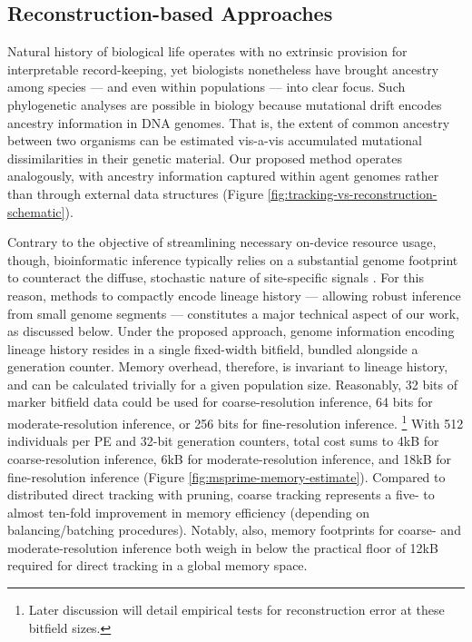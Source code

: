 

\subsection{Reconstruction-based Approaches}

Natural history of biological life operates with no extrinsic provision for interpretable record-keeping, yet biologists nonetheless have brought ancestry among species --- and even within populations --- into clear focus.
Such phylogenetic analyses are possible in biology because mutational drift encodes ancestry information in DNA genomes.
That is, the extent of common ancestry between two organisms can be estimated vis-a-vis accumulated mutational dissimilarities in their genetic material.
Our proposed method operates analogously, with ancestry information captured within agent genomes rather than through external data structures (Figure \ref{fig:tracking-vs-reconstruction-schematic}).

Contrary to the objective of streamlining necessary on-device resource usage, though, bioinformatic inference typically relies on a substantial genome footprint to counteract the diffuse, stochastic nature of site-specific signals \citep{TODO}.
For this reason, methods to compactly encode lineage history --- allowing robust inference from small genome segments --- constitutes a major technical aspect of our work, as discussed below.
Under the proposed approach, genome information encoding lineage history resides in a single fixed-width bitfield, bundled alongside a generation counter.
Memory overhead, therefore, is invariant to lineage history, and can be calculated trivially for a given population size.
Reasonably, 32 bits of marker bitfield data could be used for coarse-resolution inference, 64 bits for moderate-resolution inference, or 256 bits for fine-resolution inference.
\unskip\footnote{%
Later discussion will detail empirical tests for reconstruction error at these bitfield sizes.
}
With 512 individuals per PE and 32-bit generation counters, total cost sums to 4kB for coarse-resolution inference, 6kB for moderate-resolution inference, and 18kB for fine-resolution inference (Figure \ref{fig:msprime-memory-estimate}).
Compared to distributed direct tracking with pruning, coarse tracking represents a five- to almost ten-fold improvement in memory efficiency (depending on balancing/batching procedures).
Notably, also, memory footprints for coarse- and moderate-resolution inference both weigh in below the practical floor of 12kB required for direct tracking in a global memory space.

